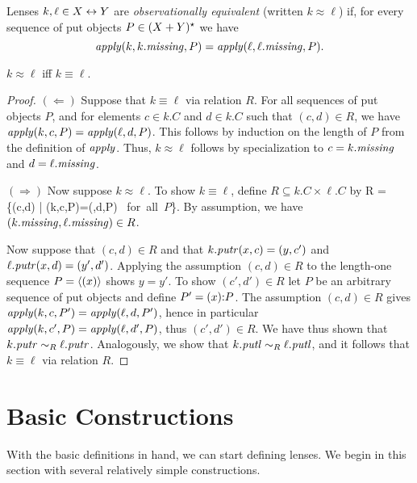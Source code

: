 \begin{defn}[$R$-similarity]
\begin{defn}
Lenses $k,\ell \in X \leftrightarrow Y$ are \emph{observationally equivalent} (written
$k \approx \ell$) if, for every sequence of put objects $P \in (X + Y)^\star$
we have
\[\mathit{apply}(k,k.\mathit{missing},P) = \mathit{apply}(\ell,\ell.\mathit{missing},P).\]
\end{defn}

\iffull
\begin{theorem}
\else
\begin{theorem}
\fi
    $k \approx \ell$ iff $k \equiv \ell$.
\end{theorem}

\begin{proof}
$(\Longleftarrow)$ Suppose that $k\equiv \ell$ via relation $R$. For all
sequences of put objects $P$, and for
elements $c \in k.C$ and $d\in k.C$ such that $(c,d) \in R$, we have
$\mathit{apply}(k,c,P)=\mathit{apply}(\ell,d,P)$. This follows by induction on the length of $P$
from the definition of $\mathit{apply}$.
Thus, $k\approx \ell$ follows by specialization to $c=k.\mathit{missing}$ and
$d=\ell.\mathit{missing}$. 

$(\Longrightarrow)$ Now suppose $k\approx \ell$. To show $k\equiv \ell$, define $R
\subseteq k.C \times \ell.C$ by
\dissdis
R = \{(c,d) \;|\; \apply(k,c,P)=\apply(\ell,d,P) \mbox{ for all $P$}\}.
\dissdis By assumption, we have $(k.\mathit{missing}, \ell.\mathit{missing}) \in R$.

Now suppose that $(c,d) \in R$ and that $k.\mathit{putr}(x,c)=(y,c')$ and
$\ell.\mathit{putr}(x,d)=(y',d')$.  Applying the assumption $(c,d) \in R$ to the
length-one sequence $P = \left<(x)\right>$ shows $y=y'$. To show
$(c',d') \in R$ let $P$ be an arbitrary sequence of put objects and define
$P' = (x) \mathord{:} P$. The assumption $(c,d) \in R$ gives $\mathit{apply}(k,c,P') =
\mathit{apply}(\ell,d,P')$, hence in particular $\mathit{apply}(k,c',P)=\mathit{apply}(\ell,d',P)$, thus
$(c',d') \in R$. We have thus shown that $k.\mathit{putr} \sim_R \ell.\mathit{putr}$.
Analogously, we show that $k.\mathit{putl} \sim_R \ell.\mathit{putl}$, and it follows that
$k\equiv \ell$ via relation $R$.
\end{proof}
\fi

\section{Basic Constructions}\label{basic}

With the basic definitions in hand, we can start defining lenses.  We
begin in this section with several relatively simple constructions.  


\end{theorem}
\end{defn}

